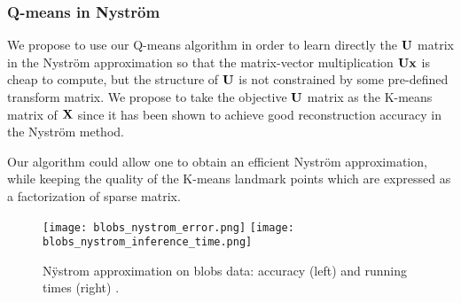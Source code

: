 \subsubsection{Q-means in Nyström}

We propose to use our Q-means algorithm in order to learn directly the ${\mathbf{U}}$ matrix in the Nyström approximation so that the matrix-vector multiplication ${\mathbf{U}} {\mathbf{x}}$ is cheap to compute, but the structure of ${\mathbf{U}}$ is not constrained by some pre-defined transform matrix. We propose to take the objective ${\mathbf{U}}$ matrix as the K-means matrix of ${\mathbf{X}}$ since it has been shown to achieve good reconstruction accuracy in the Nyström method.


Our algorithm could allow one to obtain an efficient Nyström approximation, while keeping the quality of the K-means landmark points which are expressed as a factorization of sparse matrix.  

\begin{figure}[tbh]
\centering
\texttt{[image: blobs\_nystrom\_error.png]}
\texttt{[image: blobs\_nystrom\_inference\_time.png]}
\caption{N\"ystrom approximation on blobs data: accuracy (left) and running times (right) .}
\label{fig:nystrom:blobs}
\end{figure}




